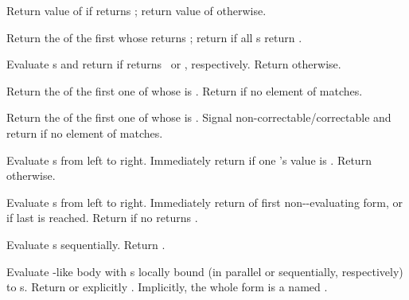 \begin{LIST}{1cm}

  {Return value of
   if  returns \T; return value of
   otherwise.
  }

  {
  Return the  of the first
   whose  returns \T; return
  \retval{\NIL} if all s return \NIL.
  }

  {
  Evaluate s and return  if 
  returns \T\ or \NIL, respectively. Return \retval{\NIL} otherwise. 
  }

  {
  Return the  of the first  one of whose  is
   .
  Return  if no element of  matches. 
  }

  {
  Return the  of the first  one of whose  is 
  . Signal non-correctable/correctable  and
  return \retval{\NIL} if no element of  matches. 
  }

  {
  Evaluate s from left to
  right. Immediately return \retval{\NIL} if one 's value is \NIL. Return
   otherwise.
  }

  {
  Evaluate s from left to
  right. Immediately return  of first
  non-\NIL-evaluating form, or  if last 
  is reached. Return \retval{\NIL} if no  returns \T.
  }

  {\label{:progn}
    Evaluate s sequentially. Return
    .
  }

  {
  Evaluate -like body with s locally bound (in
  parallel or sequentially, respectively) to s. Return
  \retval{\NIL} or explicitly .
  Implicitly, the whole form is a  named \NIL. 
  }


\end{LIST}

